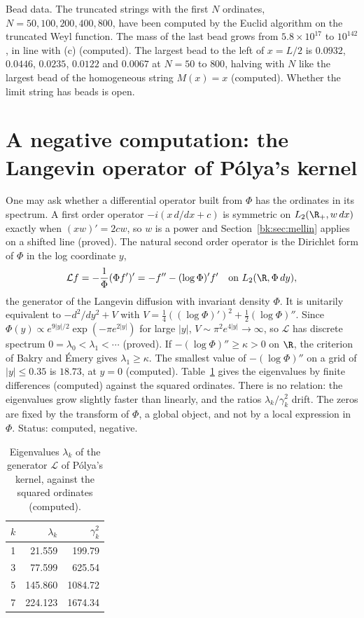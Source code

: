 Bead data. The truncated strings with the first $N$ ordinates, $N=50,100,200,400,800$, have been computed by the Euclid algorithm on the truncated Weyl function. The mass of the last bead grows from $5.8\times10^{17}$ to $10^{142}$, in line with (c) (computed). The largest bead to the left of $x=L/2$ is $0.0932$, $0.0446$, $0.0235$, $0.0122$ and $0.0067$ at $N=50$ to $800$, halving with $N$ like the largest bead of the homogeneous string $M(x)=x$ (computed). Whether the limit string has beads is open.

\section{A negative computation: the Langevin operator of P\'olya's kernel}\label{bk:sec:langevin}

One may ask whether a differential operator built from $\Phi$ has the ordinates in its spectrum. A first order operator $-i(x\,d/dx+c)$ is symmetric on $L_2(\R_+,w\,dx)$ exactly when $(xw)'=2cw$, so $w$ is a power and Section~\ref{bk:sec:mellin} applies on a shifted line (proved). The natural second order operator is the Dirichlet form of $\Phi$ in the log coordinate $y$,
\[
\mathcal Lf=-\frac1\Phi(\Phi f')'=-f''-(\log\Phi)'f'\quad\text{on }L_2(\R,\Phi\,dy),
\]
the generator of the Langevin diffusion with invariant density $\Phi$. It is unitarily equivalent to $-d^2/dy^2+V$ with $V=\frac14((\log\Phi)')^2+\frac12(\log\Phi)''$. Since $\Phi(y)\propto e^{9|y|/2}\exp(-\pi e^{2|y|})$ for large $|y|$, $V\sim\pi^2e^{4|y|}\to\infty$, so $\mathcal L$ has discrete spectrum $0=\lambda_0<\lambda_1<\cdots$ (proved). If $-(\log\Phi)''\ge\kappa>0$ on $\R$, the criterion of Bakry and \'Emery gives $\lambda_1\ge\kappa$.
The smallest value of $-(\log\Phi)''$ on a grid of $|y|\le0.35$ is $18.73$, at $y=0$ (computed). Table~\ref{bk:tab:langevin} gives the eigenvalues by finite differences (computed) against the squared ordinates. There is no relation: the eigenvalues grow slightly faster than linearly, and the ratios $\lambda_k/\gamma_k^2$ drift. The zeros are fixed by the transform of $\Phi$, a global object, and not by a local expression in $\Phi$. Status: computed, negative.

\begin{table}[t]
\centering
\caption{Eigenvalues $\lambda_k$ of the generator $\mathcal L$ of P\'olya's kernel, against the squared ordinates (computed).}
\label{bk:tab:langevin}
\begin{tabular}{rrr}
\toprule
$k$ & $\lambda_k$ & $\gamma_k^2$\\
\midrule
1 & 21.559 & 199.79\\
3 & 77.599 & 625.54\\
5 & 145.860 & 1084.72\\
7 & 224.123 & 1674.34\\
\bottomrule
\end{tabular}
\end{table}

